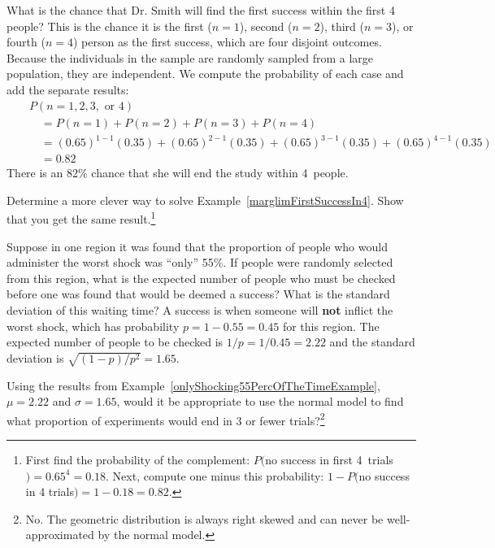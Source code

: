 \begin{example}{What is the chance that Dr. Smith will find the first success within the first 4 people?} \label{marglimFirstSuccessIn4}
This is the chance it is the first ($n=1$), second ($n=2$), third ($n=3$), or fourth ($n=4$) person as the first success, which are four disjoint outcomes. Because the individuals in the sample are randomly sampled from a large population, they are independent. We compute the probability of each case and add the separate results:
\begin{eqnarray*}
&&P(n=1, 2, 3,\text{ or }4) \\
	&& \quad = P(n=1)+P(n=2)+P(n=3)+P(n=4) \\
	&& \quad = (0.65)^{1-1}(0.35) + (0.65)^{2-1}(0.35) + (0.65)^{3-1}(0.35) + (0.65)^{4-1}(0.35) \\
	&& \quad = 0.82
\end{eqnarray*}
There is an 82\% chance that she will end the study within 4~people.
\end{example}

\begin{exercise}
Determine a more clever way to solve Example~\ref{marglimFirstSuccessIn4}. Show that you get the same result.\footnote{First find the probability of the complement: $P($no success in first 4~trials$) = 0.65^4 = 0.18$. Next, compute one minus this probability: $1-P($no success in 4 trials$) = 1-0.18 = 0.82$.}
\end{exercise}

\begin{example}{Suppose in one region it was found that the proportion of people who would administer the worst shock was ``only'' 55\%. If people were randomly selected from this region, what is the expected number of people who must be checked before one was found that would be deemed a success? What is the standard deviation of this waiting time?} \label{onlyShocking55PercOfTheTimeExample}
A success is when someone will \textbf{not} inflict the worst shock, which has probability $p=1-0.55=0.45$ for this region. The expected number of people to be checked is $1/p = 1/0.45 = 2.22$ and the standard deviation is $\sqrt{(1-p)/p^2} = 1.65$.
\end{example}

\begin{exercise}
Using the results from Example~\ref{onlyShocking55PercOfTheTimeExample}, $\mu = 2.22$ and $\sigma = 1.65$, would it be appropriate to use the normal model to find what proportion of experiments would end in 3 or fewer trials?\footnote{No. The geometric distribution is always right skewed and can never be well-approximated by the normal model.}
\end{exercise}

